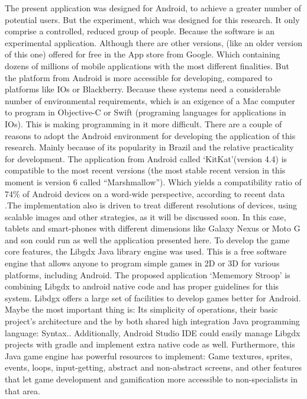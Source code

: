 		
The present application was designed for Android, to achieve a greater number of potential users. But the experiment, which was designed for this research. It only comprise a controlled, reduced group of people. Because the software is an experimental application. Although there are other versions, (like an older version of this one) offered for free in the App store from Google. Which containing dozens of millions of mobile applications with the most different finalities. But the platform from Android is more accessible for developing, compared to platforms like IOs or Blackberry. Because these systems need a considerable number of environmental requirements, which is an exigence  of a Mac computer to program in Objective-C or Swift (programing languages for applications in IOs). This is making programming in it more difficult. There are a couple of reasons to adopt the Android environment for developing the application of this research. Mainly because of its popularity in Brazil and the relative practicality for development.		
The application from Android called ‘KitKat’(version 4.4) is compatible to the most recent versions (the most stable recent version in this moment is version 6 called ``Marshmallow''). Which yields a compatibility ratio of 74\% of Android devices on a word-wide perspective, according to recent data \citep{android-official}.The implementation also is driven to treat different resolutions of devices, using scalable images and other strategies, as it will be discussed soon. In this case, tablets and smart-phones with different dimensions like Galaxy Nexus or Moto G and son could run as well the application presented here. To develop the game core features, the Libgdx Java library engine was used. This is a free software engine that allows anyone to program simple games  in 2D or 3D for various platforms, including Android. The proposed application ‘Mememory Stroop’ is combining Libgdx to android native code and  has proper guidelines for this system. Libdgx offers a large set of facilities to develop games better for Android. Maybe the most important thing is: Its simplicity of operations, their basic project's architecture and the by both shared high integration Java programming language: Syntax.. Additionally, Android Studio IDE could easily manage Libgdx projects with gradle and implement extra native code as well. Furthermore, this Java game engine has powerful resources to implement: Game textures, sprites, events, loops, input-getting, abstract and non-abstract screens, and other features that let game development and gamification more accessible to non-specialists in that area.

